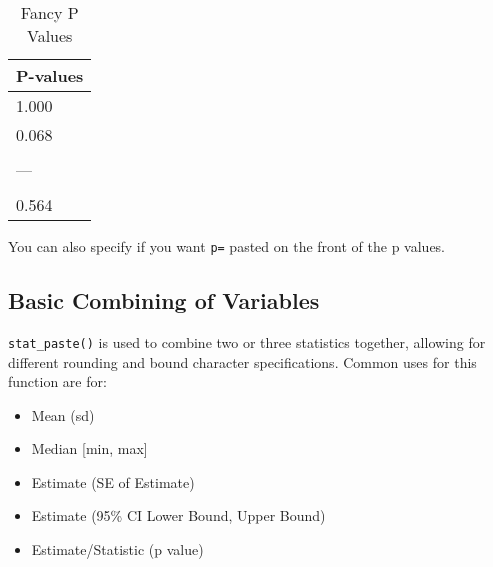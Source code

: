 \documentclass[table]{article}
\providecommand{\tightlist}{%
  \setlength{\itemsep}{0pt}\setlength{\parskip}{0pt}}
\begin{document}
\begin{table}[t]

\caption{\label{tab:unnamed-chunk-6}Fancy P Values}
\centering
\begin{tabular}{l}
\hline
P-values\\
\hline
1.000\\
\hline
0.068\\
\hline
\cellcolor{yellow}{0.004}\\
\hline
---\\
\hline
\cellcolor{yellow}{<0.001}\\
\hline
0.564\\
\hline
\end{tabular}
\end{table}

You can also specify if you want \texttt{p=} pasted on the front of the
p values.

\hypertarget{basic-combining-of-variables}{%
\subsection{Basic Combining of
Variables}\label{basic-combining-of-variables}}

\texttt{stat\_paste()} is used to combine two or three statistics
together, allowing for different rounding and bound character
specifications. Common uses for this function are for:

\begin{itemize}
\tightlist
\item
  Mean (sd)
\item
  Median {[}min, max{]}
\item
  Estimate (SE of Estimate)
\item
  Estimate (95\% CI Lower Bound, Upper Bound)
\item
  Estimate/Statistic (p value)
\end{itemize}
\end{document}
